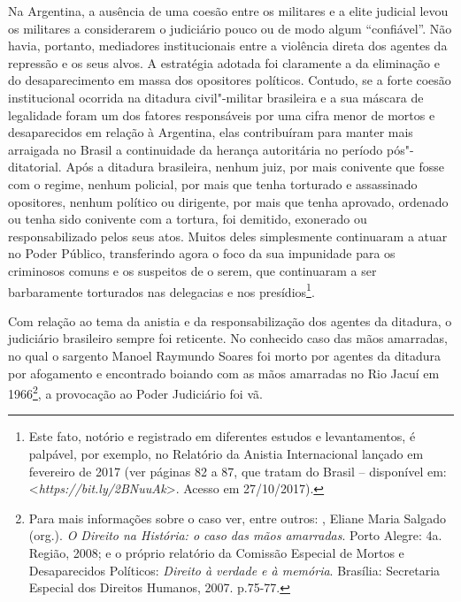 Na Argentina, a ausência de uma coesão entre os militares e a elite
judicial levou os militares a considerarem o judiciário pouco ou de modo
algum ``confiável''. Não havia, portanto, mediadores institucionais
entre a violência direta dos agentes da repressão e os seus alvos. A
estratégia adotada foi claramente a da eliminação e do desaparecimento
em massa dos opositores políticos. Contudo, se a forte coesão
institucional ocorrida na ditadura civil"-militar brasileira e a sua
máscara de legalidade foram um dos fatores responsáveis por uma cifra
menor de mortos e desaparecidos em relação à Argentina, elas
contribuíram para manter mais arraigada no Brasil a continuidade da
herança autoritária no período pós"-ditatorial. Após a ditadura
brasileira, nenhum juiz, por mais conivente que fosse com o regime,
nenhum policial, por mais que tenha torturado e assassinado opositores,
nenhum político ou dirigente, por mais que tenha aprovado, ordenado ou
tenha sido conivente com a tortura, foi demitido, exonerado ou
responsabilizado pelos seus atos. Muitos deles simplesmente continuaram
a atuar no Poder Público, transferindo agora o foco da sua impunidade
para os criminosos comuns e os suspeitos de o serem, que continuaram a
ser barbaramente torturados nas delegacias e nos presídios\footnote{Este
  fato, notório e registrado em diferentes estudos e levantamentos, é
  palpável, por exemplo, no Relatório da Anistia Internacional lançado
  em fevereiro de 2017 (ver páginas 82 a 87, que tratam do Brasil --
  disponível em: \textless{}\emph{https://bit.ly/2BNuuAk}\textgreater{}.
  Acesso em 27/10/2017).}.

Com relação ao tema da anistia e da responsabilização dos agentes da
ditadura, o judiciário brasileiro sempre foi reticente. No conhecido
caso das mãos amarradas, no qual o sargento Manoel Raymundo Soares foi
morto por agentes da ditadura por afogamento e encontrado boiando com as
mãos amarradas no Rio Jacuí em 1966\footnote{Para mais informações sobre
  o caso ver, entre outros: , Eliane Maria Salgado (org.).
  \emph{O Direito na História: o caso das mãos amarradas}. Porto
  Alegre:  4a. Região, 2008; e o próprio relatório da Comissão
  Especial de Mortos e Desaparecidos Políticos: \emph{Direito à verdade e à memória}.
  Brasília: Secretaria Especial dos Direitos Humanos, 2007. p.75-77.}, a
provocação ao Poder Judiciário foi vã.

